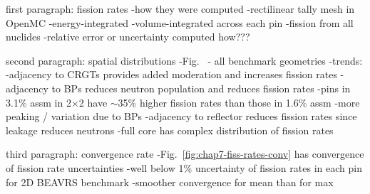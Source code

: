 first paragraph: fission rates
-how they were computed 
  -rectilinear tally mesh in OpenMC
  -energy-integrated
  -volume-integrated across each pin
  -fission from all nuclides
-relative error or uncertainty computed how???

second paragraph: spatial distributions
-Fig.~ - all benchmark geometries
-trends:
  -adjacency to \ac{CRGT}s provides added moderation and increases fission rates
  -adjacency to \ac{BP}s reduces neutron population and reduces fission rates
  -pins in 3.1\% assm in 2$\times$2 have $\sim$35\% higher fission rates than those in 1.6\% assm
    -more peaking / variation due to \ac{BP}s
  -adjacency to reflector reduces fission rates since leakage reduces neutrons
  -full core has complex distribution of fission rates

third paragraph: convergence rate
-Fig.~\ref{fig:chap7-fiss-rates-conv} has convergence of fission rate uncertainties
-well below 1\% uncertainty of fission rates in each pin for 2D \ac{BEAVRS} benchmark
-smoother convergence for mean than for max

